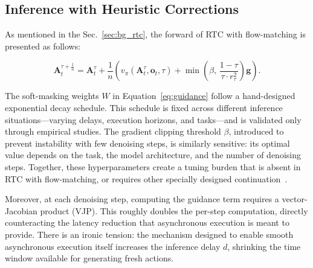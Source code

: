 \documentclass{article}
\begin{document}
\subsection{Inference with Heuristic Corrections}
\label{sec:lim_inference}

As mentioned in the Sec.~\ref{sec:bg_rtc}, the forward of RTC with flow-matching is presented as follows:

\begin{equation}
\label{eqn: continuousRTC forward}
\mathbf{A}_t^{\tau+\frac{1}{n}} = \mathbf{A}_t^\tau + \frac{1}{n}\!\left(v_\pi(\mathbf{A}_t^\tau, \mathbf{o}_t, \tau) + \min\!\left(\beta,\, \frac{1-\tau}{\tau \cdot r_\tau^2}\right) \mathbf{g} \right).
\end{equation}

The soft-masking weights $W$ in Equation~\ref{eq:guidance} follow a hand-designed exponential decay schedule.
This schedule is fixed across different inference situations---varying delays, execution horizons, and tasks---and is validated only through empirical studies.
The gradient clipping threshold $\beta$, introduced to prevent instability with few denoising steps, is similarly sensitive: its optimal value depends on the task, the model architecture, and the number of denoising steps.
Together, these hyperparameters create a tuning burden that is absent in RTC with flow-matching, or requires other specially designed continuation~\citep{liu2026learning}.

Moreover, at each denoising step, computing the guidance term requires a vector-Jacobian product (VJP).
This roughly doubles the per-step computation, directly counteracting the latency reduction that asynchronous execution is meant to provide.
There is an ironic tension: the mechanism designed to enable smooth asynchronous execution itself increases the inference delay $d$, shrinking the time window available for generating fresh actions.
\end{document}
